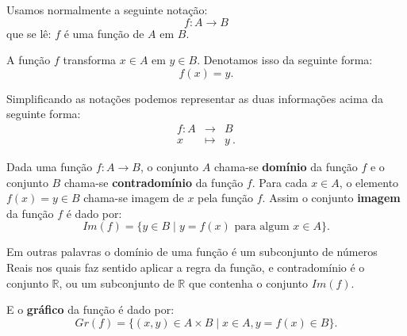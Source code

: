 \newpage

Usamos normalmente a seguinte notação:
\[f: A \rightarrow B\]
que se lê: $f$ é uma função de $A$ em $B$.

A função $f$ transforma $x \in A$ em $y \in B$. Denotamos isso da seguinte forma:
\[f(x) = y .\]

Simplificando as notações podemos representar as duas informações acima da seguinte forma:
\begin{eqnarray*}
 f: A & \rightarrow & B \\
 x & \mapsto & y \ .
\end{eqnarray*}

Dada uma função $f: A \rightarrow B$, o conjunto $A$ chama-se \textbf{domínio} da função $f$ e o conjunto $B$ chama-se \textbf{contradomínio} da função $f$.  Para cada $x \in A$, o elemento $f(x)= y \in B$ chama-se imagem de $x$ pela função $f$. Assim o conjunto \textbf{imagem} da função $f$ é dado por:
\[Im(f)= \{ y \in B \mid y = f(x) \text{ para algum } x \in A\} .\]

Em outras palavras o domínio de uma função é um subconjunto de números Reais nos quais faz sentido aplicar a regra da função, e contradomínio é o conjunto $\mathbb{R}$, ou um subconjunto de $\mathbb{R}$ que contenha o conjunto $Im(f)$.

E o \textbf{gráfico} da função é dado por:
\[Gr(f) = \{ (x, y) \in A \times B \mid x \in A, y = f(x) \in B\} .\]


